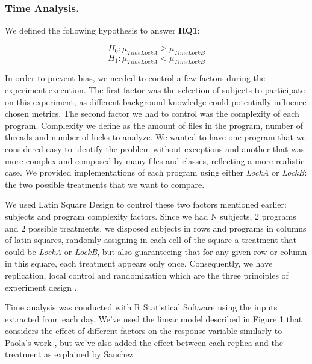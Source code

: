 \subsubsection{Time Analysis.}

We defined the following hypothesis to answer {\bf RQ1}:

\begin{equation}
  H_{0} : \mu_{TimeLockA} \geq \mu_{TimeLockB}
\end{equation}
\begin{equation}
  H_{1} : \mu_{TimeLockA} < \mu_{TimeLockB}
\end{equation}

In order to prevent bias, we needed to control a few factors during the experiment execution. The first factor was the selection of subjects to participate on this experiment, as different background knowledge could potentially influence chosen metrics. The second factor we had to control was the complexity of each program. Complexity we define as the amount of files in the program, number of threads and number of locks to analyze. We wanted to have one program that we considered easy to identify the problem without exceptions and another that was more complex and composed by many files and classes, reflecting a more realistic case. We provided implementations of each program using either \emph{LockA} or \emph{LockB}: the two possible treatments that we want to compare.

We used Latin Square Design to control these two factors mentioned earlier: subjects and program complexity factors. Since we had N subjects, 2 programs and 2 possible treatments, we disposed subjects in rows and programs in columns of latin squares, randomly assigning in each cell of the square a treatment that could be \emph{LockA} or \emph{LockB}, but also guaranteeing that for any given row or column in this square, each treatment appears only once. Consequently, we have replication, local control and randomization which are the three principles of experiment design \cite{box}.

Time analysis was conducted with R Statistical Software using the inputs extracted from each day. We've used the linear model described in Figure 1 that considers the effect of different factors on the response variable similarly to Paola's work \cite{paola}, but we've also added the effect between each replica and the treatment as explained by Sanchez \cite{sanchez}.


